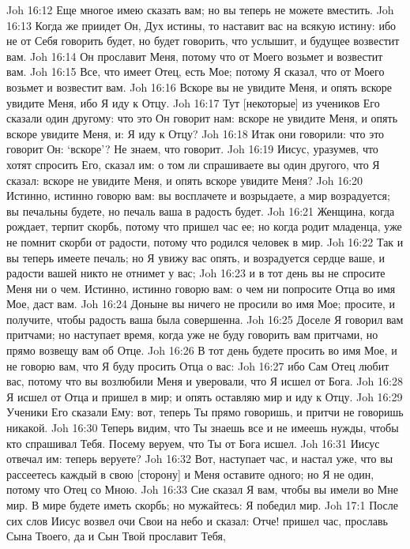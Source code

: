 Joh 16:12  Еще многое имею сказать вам; но вы теперь не можете вместить.
Joh 16:13  Когда же приидет Он, Дух истины, то наставит вас на всякую истину: ибо не от Себя говорить будет, но будет говорить, что услышит, и будущее возвестит вам.
Joh 16:14  Он прославит Меня, потому что от Моего возьмет и возвестит вам.
Joh 16:15  Все, что имеет Отец, есть Мое; потому Я сказал, что от Моего возьмет и возвестит вам.
Joh 16:16  Вскоре вы не увидите Меня, и опять вскоре увидите Меня, ибо Я иду к Отцу.
Joh 16:17  Тут [некоторые] из учеников Его сказали один другому: что это Он говорит нам: вскоре не увидите Меня, и опять вскоре увидите Меня, и: Я иду к Отцу?
Joh 16:18  Итак они говорили: что это говорит Он: `вскоре'? Не знаем, что говорит.
Joh 16:19  Иисус, уразумев, что хотят спросить Его, сказал им: о том ли спрашиваете вы один другого, что Я сказал: вскоре не увидите Меня, и опять вскоре увидите Меня?
Joh 16:20  Истинно, истинно говорю вам: вы восплачете и возрыдаете, а мир возрадуется; вы печальны будете, но печаль ваша в радость будет.
Joh 16:21  Женщина, когда рождает, терпит скорбь, потому что пришел час ее; но когда родит младенца, уже не помнит скорби от радости, потому что родился человек в мир.
Joh 16:22  Так и вы теперь имеете печаль; но Я увижу вас опять, и возрадуется сердце ваше, и радости вашей никто не отнимет у вас;
Joh 16:23  и в тот день вы не спросите Меня ни о чем. Истинно, истинно говорю вам: о чем ни попросите Отца во имя Мое, даст вам.
Joh 16:24  Доныне вы ничего не просили во имя Мое; просите, и получите, чтобы радость ваша была совершенна.
Joh 16:25  Доселе Я говорил вам притчами; но наступает время, когда уже не буду говорить вам притчами, но прямо возвещу вам об Отце.
Joh 16:26  В тот день будете просить во имя Мое, и не говорю вам, что Я буду просить Отца о вас:
Joh 16:27  ибо Сам Отец любит вас, потому что вы возлюбили Меня и уверовали, что Я исшел от Бога.
Joh 16:28  Я исшел от Отца и пришел в мир; и опять оставляю мир и иду к Отцу.
Joh 16:29  Ученики Его сказали Ему: вот, теперь Ты прямо говоришь, и притчи не говоришь никакой.
Joh 16:30  Теперь видим, что Ты знаешь все и не имеешь нужды, чтобы кто спрашивал Тебя. Посему веруем, что Ты от Бога исшел.
Joh 16:31  Иисус отвечал им: теперь веруете?
Joh 16:32  Вот, наступает час, и настал уже, что вы рассеетесь каждый в свою [сторону] и Меня оставите одного; но Я не один, потому что Отец со Мною.
Joh 16:33  Сие сказал Я вам, чтобы вы имели во Мне мир. В мире будете иметь скорбь; но мужайтесь: Я победил мир.
Joh 17:1  После сих слов Иисус возвел очи Свои на небо и сказал: Отче! пришел час, прославь Сына Твоего, да и Сын Твой прославит Тебя,
